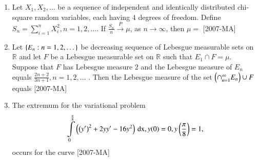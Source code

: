 \documentclass[journal]{IEEEtran}
\begin{document}
\begin{enumerate}
\item Let $X_1,X_2,\dots$ be a sequence of independent and identically distributed chi-square random variables, each having $4$ degrees of freedom. Define $S_n=\sum_{i=1}^{n}X_i ^2, n=1,2,\dots$. If $\frac{S_n}{n} \xrightarrow{P} \mu$, as $n \rightarrow \infty$, then $\mu=$ \hfill{[2007-MA]}
\begin{enumerate}
\end{enumerate}

\item Let $\left\{E_n: n=1,2,\dots\right\}$ be decreasing sequence of Lebesgue measurable sets on $\mathbb R$ and let $F$ be a Lebesgue measurable set on $\mathbb R$ such that $E_1\cap F=\mu$. Suppose that $F$ has Lebesgue measure $2$ and the Lebesgue measure of $E_n$ equals $\frac{2n+2}{3n+1}, n=1,2,\dots$ . Then the Lebesgue measure of the set $\left(\cap_{n=1}^{\infty}E_n\right)\cup F$ equals \hfill{[2007-MA]}
\begin{enumerate}
\end{enumerate}

\item The extremum for the variational problem 
\begin{align*}
    \int\limits_0^\frac{\pi}{8} \left(\left(y'\right)^2+2yy'-16y^2\right)\, \text{dx}, y(0)=0, y\left(\frac{\pi}{8}\right)=1,
\end{align*}
occurs for the curve \hfill{[2007-MA]}
\begin{enumerate}
\end{enumerate}
\end{enumerate}
\end{document}
